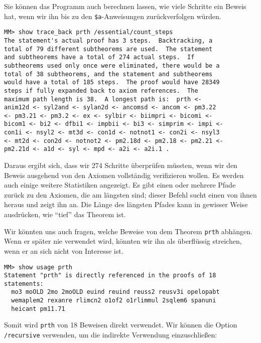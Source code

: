 Sie können das Programm auch berechnen lassen, wie viele Schritte ein Beweis hat, wenn wir ihn bis zu den \texttt{\$a}-Anweisungen zurückverfolgen würden.

\begin{verbatim}
MM> show trace_back prth /essential/count_steps
The statement's actual proof has 3 steps.  Backtracking, a
total of 79 different subtheorems are used.  The statement
and subtheorems have a total of 274 actual steps.  If
subtheorems used only once were eliminated, there would be a
total of 38 subtheorems, and the statement and subtheorems
would have a total of 185 steps.  The proof would have 28349
steps if fully expanded back to axiom references.  The
maximum path length is 38.  A longest path is:  prth <-
anim12d <- syl2and <- sylan2d <- ancomsd <- ancom <- pm3.22
<- pm3.21 <- pm3.2 <- ex <- sylbir <- biimpri <- bicomi <-
bicom1 <- bi2 <- dfbi1 <- impbii <- bi3 <- simprim <- impi <-
con1i <- nsyl2 <- mt3d <- con1d <- notnot1 <- con2i <- nsyl3
<- mt2d <- con2d <- notnot2 <- pm2.18d <- pm2.18 <- pm2.21 <-
pm2.21d <- a1d <- syl <- mpd <- a2i <- a2i.1 .
\end{verbatim}

Daraus ergibt sich, dass wir 274 Schritte überprüfen müssten, wenn wir den Beweis ausgehend von den Axiomen vollständig verifizieren wollen.  Es werden auch einige weitere Statistiken angezeigt.  Es gibt einen oder mehrere Pfade zurück zu den Axiomen, die am längsten sind; dieser Befehl sucht einen von ihnen heraus und zeigt ihn an.  Die Länge des längsten Pfades kann in gewisser Weise ausdrücken, wie "`tief"' das Theorem ist.

Wir könnten uns auch fragen, welche Beweise von dem Theorem \texttt{prth} abhängen.  Wenn er später nie verwendet wird, könnten wir ihn als überflüssig streichen, wenn er an sich nicht von Interesse ist.

\begin{verbatim}
MM> show usage prth
Statement "prth" is directly referenced in the proofs of 18
statements:
  mo3 moOLD 2mo 2moOLD euind reuind reuss2 reusv3i opelopabt
  wemaplem2 rexanre rlimcn2 o1of2 o1rlimmul 2sqlem6 spanuni
  heicant pm11.71
\end{verbatim}

Somit wird \texttt{prth} von 18 Beweisen direkt verwendet. Wir können die Option \texttt{/recursive} verwenden, um die indirekte Verwendung einzuschließen:

